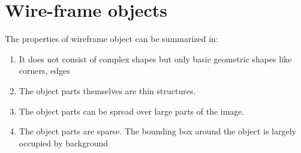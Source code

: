 	

	



\section{Wire-frame objects}


The properties of wireframe object can be summarized in:
\begin{enumerate}
	\item It does not consist of complex shapes but only basic geometric shapes like corners, edges
	\item The object parts themselves are thin structures.
	\item The object parts can be spread over large parts of the image.
	\item The object parts are sparse. The bounding box around the object is largely occupied by background
\end{enumerate}

